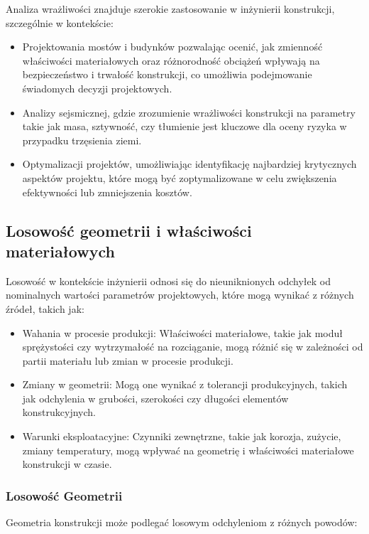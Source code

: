 Analiza wrażliwości znajduje szerokie zastosowanie w inżynierii konstrukcji, szczególnie w kontekście:

\begin{itemize}
    \item Projektowania mostów i budynków pozwalając ocenić, jak zmienność właściwości materiałowych oraz różnorodność obciążeń wpływają na bezpieczeństwo i trwałość konstrukcji, co umożliwia podejmowanie świadomych decyzji projektowych.
    \item Analizy sejsmicznej, gdzie zrozumienie wrażliwości konstrukcji na parametry takie jak masa, sztywność, czy tłumienie jest kluczowe dla oceny ryzyka w przypadku trzęsienia ziemi.
    \item Optymalizacji projektów, umożliwiając identyfikację najbardziej krytycznych aspektów projektu, które mogą być zoptymalizowane w celu zwiększenia efektywności lub zmniejszenia kosztów.
\end{itemize}

\subsection{Losowość geometrii i właściwości materiałowych}

Losowość w kontekście inżynierii odnosi się do nieuniknionych odchyłek od nominalnych wartości parametrów projektowych, które mogą wynikać z różnych źródeł, takich jak:

\begin{itemize}
    \item Wahania w procesie produkcji: Właściwości materiałowe, takie jak moduł sprężystości czy wytrzymałość na rozciąganie, mogą różnić się w zależności od partii materiału lub zmian w procesie produkcji.
    \item Zmiany w geometrii: Mogą one wynikać z tolerancji produkcyjnych, takich jak odchylenia w grubości, szerokości czy długości elementów konstrukcyjnych.
    \item Warunki eksploatacyjne: Czynniki zewnętrzne, takie jak korozja, zużycie, zmiany temperatury, mogą wpływać na geometrię i właściwości materiałowe konstrukcji w czasie.
\end{itemize}

\subsubsection*{Losowość Geometrii}

Geometria konstrukcji może podlegać losowym odchyleniom z różnych powodów:

